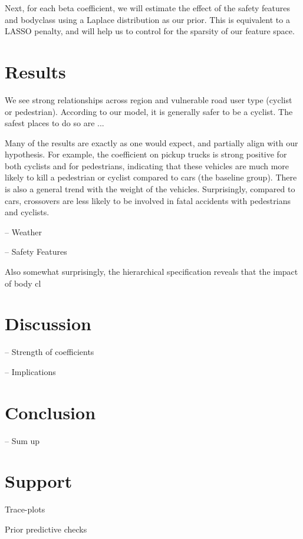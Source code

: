 \documentclass[12pt]{article}
\begin{document}
Next, for each beta coefficient, we will estimate the effect of the safety features and bodyclass using a Laplace 
distribution as our prior. This is equivalent to a LASSO penalty\cite{tibshirani_regression_1996}, and will help
us to control for the sparsity of our feature space. 


\section{Results}

We see strong relationships across region and vulnerable road user type (cyclist or pedestrian). According to our
model, it is generally safer to be a cyclist. The safest places to do so are ...

Many of the results are exactly as one would expect, and partially align with our hypothesis. For example, the 
coefficient on pickup trucks is strong positive for both cyclists and for pedestrians, indicating that these vehicles
are much more likely to kill a pedestrian or cyclist compared to cars (the baseline group). There is also a general 
trend with the weight of the vehicles. Surprisingly, compared to cars, crossovers are less likely to be 
involved in fatal accidents with pedestrians and cyclists. 

-- Weather


-- Safety Features


Also somewhat surprisingly, the hierarchical specification 
reveals that the impact of body cl


\section{Discussion}

-- Strength of coefficients

-- Implications

\section{Conclusion}

-- Sum up

\section{Support}

Trace-plots

Prior predictive checks

\printbibliography
\end{document}
